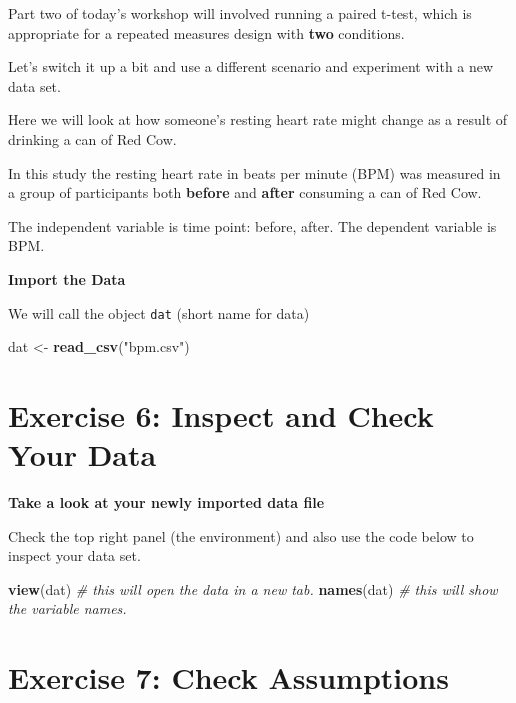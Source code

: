 \documentclass[
]{book}
\newenvironment{Shaded}{\begin{snugshade}}{\end{snugshade}}
\newcommand{\CommentTok}[1]{\textcolor[rgb]{0.56,0.35,0.01}{\textit{#1}}}
\newcommand{\FunctionTok}[1]{\textcolor[rgb]{0.13,0.29,0.53}{\textbf{#1}}}
\newcommand{\NormalTok}[1]{#1}
\newcommand{\OtherTok}[1]{\textcolor[rgb]{0.56,0.35,0.01}{#1}}
\newcommand{\StringTok}[1]{\textcolor[rgb]{0.31,0.60,0.02}{#1}}
\let\oldsection\section
\renewcommand{\section}{\needspace{5\baselineskip}\oldsection}
\begin{document}
Part two of today's workshop will involved running a paired t-test, which is appropriate for a repeated measures design with \textbf{two} conditions.

Let's switch it up a bit and use a different scenario and experiment with a new data set.

Here we will look at how someone's resting heart rate might change as a result of drinking a can of Red Cow.

In this study the resting heart rate in beats per minute (BPM) was measured in a group of participants both \textbf{before} and \textbf{after} consuming a can of Red Cow.

The independent variable is time point: before, after. The dependent variable is BPM.

\textbf{Import the Data}

We will call the object \texttt{dat} (short name for data)

\begin{Shaded}
\begin{Highlighting}[]
\NormalTok{dat }\OtherTok{\textless{}{-}} \FunctionTok{read\_csv}\NormalTok{(}\StringTok{"bpm.csv"}\NormalTok{)}
\end{Highlighting}
\end{Shaded}

\section{Exercise 6: Inspect and Check Your Data}\label{exercise-6-inspect-and-check-your-data}

\textbf{Take a look at your newly imported data file}

Check the top right panel (the environment) and also use the code below to inspect your data set.

\begin{Shaded}
\begin{Highlighting}[]
\FunctionTok{view}\NormalTok{(dat) }\CommentTok{\# this will open the data in a new tab.}
\FunctionTok{names}\NormalTok{(dat) }\CommentTok{\# this will show the variable names.}
\end{Highlighting}
\end{Shaded}

\section{Exercise 7: Check Assumptions}\label{exercise-7-check-assumptions}
\end{document}
